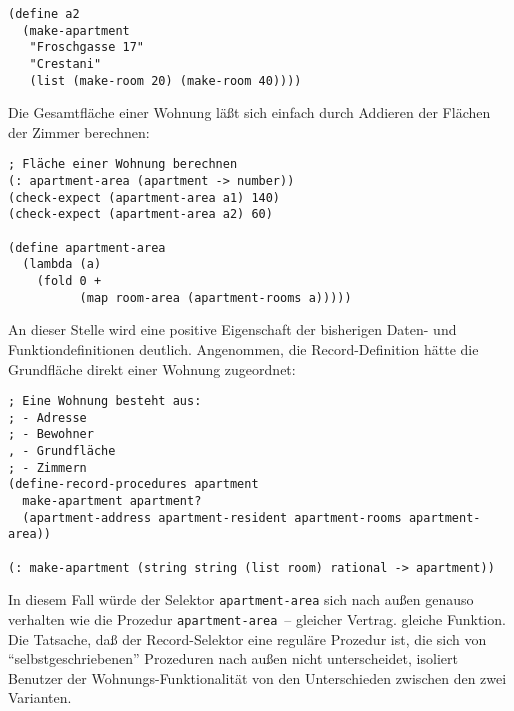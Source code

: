 %
%
\begin{verbatim}
(define a2
  (make-apartment
   "Froschgasse 17"
   "Crestani"
   (list (make-room 20) (make-room 40))))
\end{verbatim}
%
Die Gesamtfläche einer Wohnung läßt sich einfach durch Addieren der
Flächen der Zimmer berechnen:
%
\begin{verbatim}
; Fläche einer Wohnung berechnen
(: apartment-area (apartment -> number))            
(check-expect (apartment-area a1) 140)
(check-expect (apartment-area a2) 60)

(define apartment-area
  (lambda (a)
    (fold 0 +
          (map room-area (apartment-rooms a)))))
\end{verbatim}
%
An dieser Stelle wird eine positive Eigenschaft der bisherigen Daten-
und Funktiondefinitionen deutlich.  Angenommen, die Record-Definition
hätte die Grundfläche direkt einer Wohnung zugeordnet:
%
\begin{verbatim}
; Eine Wohnung besteht aus:
; - Adresse
; - Bewohner
, - Grundfläche
; - Zimmern
(define-record-procedures apartment
  make-apartment apartment?
  (apartment-address apartment-resident apartment-rooms apartment-area))

(: make-apartment (string string (list room) rational -> apartment))
\end{verbatim}
%
In diesem Fall würde der Selektor \texttt{apartment-area} sich nach
außen genauso verhalten wie die Prozedur \texttt{apartment-area}~--
gleicher Vertrag. gleiche Funktion.  Die Tatsache, daß der
Record-Selektor eine reguläre Prozedur ist, die sich von
"`selbstgeschriebenen"' Prozeduren nach außen nicht unterscheidet,
isoliert Benutzer der Wohnungs-Funktionalität von den Unterschieden
zwischen den zwei Varianten.

